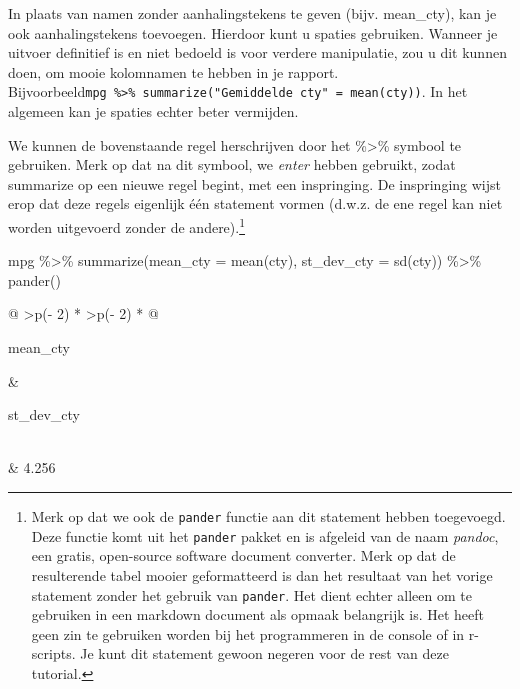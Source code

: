 \documentclass[]{tufte-book}
\newenvironment{Shaded}{}{}
\newcommand{\AttributeTok}[1]{\textcolor[rgb]{0.49,0.56,0.16}{#1}}
\newcommand{\FunctionTok}[1]{\textcolor[rgb]{0.02,0.16,0.49}{#1}}
\newcommand{\NormalTok}[1]{#1}
\newcommand{\SpecialCharTok}[1]{\textcolor[rgb]{0.25,0.44,0.63}{#1}}
\begin{document}
In plaats van namen zonder aanhalingstekens te geven (bijv. mean\_cty), kan je ook aanhalingstekens toevoegen. Hierdoor kunt u spaties gebruiken. Wanneer je uitvoer definitief is en niet bedoeld is voor verdere manipulatie, zou u dit kunnen doen, om mooie kolomnamen te hebben in je rapport. Bijvoorbeeld\texttt{mpg\ \%\textgreater{}\%\ summarize("Gemiddelde\ cty"\ =\ mean(cty))}. In het algemeen kan je spaties echter beter vermijden.

We kunnen de bovenstaande regel herschrijven door het \%\textgreater\% symbool te gebruiken. Merk op dat na dit symbool, we \emph{enter} hebben gebruikt, zodat summarize op een nieuwe regel begint, met een inspringing. De inspringing wijst erop dat deze regels eigenlijk één statement vormen (d.w.z. de ene regel kan niet worden uitgevoerd zonder de andere).\footnote{Merk op dat we ook de \texttt{pander} functie aan dit statement hebben toegevoegd. Deze functie komt uit het \texttt{pander} pakket en is afgeleid van de naam \emph{pandoc}, een gratis, open-source software document converter. Merk op dat de resulterende tabel mooier geformatteerd is dan het resultaat van het vorige statement zonder het gebruik van \texttt{pander}. Het dient echter alleen om te gebruiken in een markdown document als opmaak belangrijk is. Het heeft geen zin te gebruiken worden bij het programmeren in de console of in r-scripts. Je kunt dit statement gewoon negeren voor de rest van deze tutorial.}

\begin{Shaded}
\begin{Highlighting}[]
\NormalTok{mpg }\SpecialCharTok{\%\textgreater{}\%}
  \FunctionTok{summarize}\NormalTok{(}\AttributeTok{mean\_cty =} \FunctionTok{mean}\NormalTok{(cty), }\AttributeTok{st\_dev\_cty =} \FunctionTok{sd}\NormalTok{(cty)) }\SpecialCharTok{\%\textgreater{}\%}
  \FunctionTok{pander}\NormalTok{()}
\end{Highlighting}
\end{Shaded}

\begin{longtable}[]{@{}
  >{\centering\arraybackslash}p{(\columnwidth - 2\tabcolsep) * }
  >{\centering\arraybackslash}p{(\columnwidth - 2\tabcolsep) * }@{}}
\toprule
\begin{minipage}[b]{\linewidth}\centering
mean\_cty
\end{minipage} & \begin{minipage}[b]{\linewidth}\centering
st\_dev\_cty
\end{minipage} \\
\midrule
{} & 4.256 \\
\bottomrule
\end{longtable}
\end{document}
